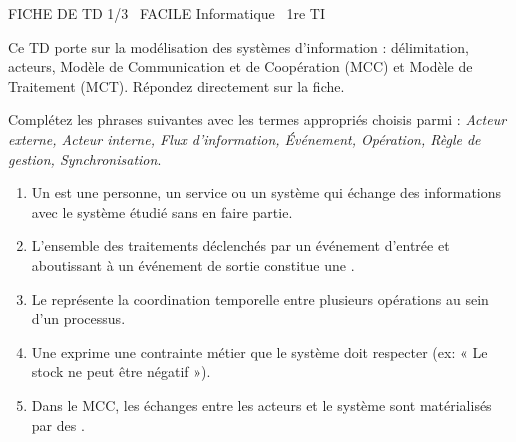 \documentclass[11pt]{article}
\begin{document}
\begin{tcolorbox}[enhanced,colback=popink,colframe=popink,arc=10pt,boxrule=0pt,left=12pt,right=12pt,top=9pt,bottom=9pt]
{\color{white}\popxbold\small FICHE DE TD 1/3 \textbullet\ FACILE \hfill Informatique \textbullet\ 1re TI\par}
\end{tcolorbox}
\vspace{4pt}
\noindent Ce TD porte sur la modélisation des systèmes d'information : délimitation, acteurs, Modèle de Communication et de Coopération (MCC) et Modèle de Traitement (MCT). Répondez directement sur la fiche.

\begin{exercice}
Complétez les phrases suivantes avec les termes appropriés choisis parmi : \textit{Acteur externe, Acteur interne, Flux d'information, Événement, Opération, Règle de gestion, Synchronisation}.
\begin{enumerate}
    \item Un \underline{\hspace{5cm}} est une personne, un service ou un système qui échange des informations avec le système étudié sans en faire partie.
    \item L'ensemble des traitements déclenchés par un événement d'entrée et aboutissant à un événement de sortie constitue une \underline{\hspace{5cm}}.
    \item Le \underline{\hspace{5cm}} représente la coordination temporelle entre plusieurs opérations au sein d'un processus.
    \item Une \underline{\hspace{5cm}} exprime une contrainte métier que le système doit respecter (ex: « Le stock ne peut être négatif »).
    \item Dans le MCC, les échanges entre les acteurs et le système sont matérialisés par des \underline{\hspace{5cm}}.
\end{enumerate}
\end{exercice}
\end{document}
